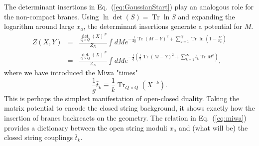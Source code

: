 \documentclass[english]{article}
\DeclareMathOperator{\Tr}{Tr}
\begin{document}
The determinant insertions in Eq.~(\ref{eq:GaussianStart}) play an analogous role for the non-compact branes. Using $ \ln \det \left( S \right) = \Tr \ln S $ and expanding the logarithm around large $x_{a}$, the determinant insertions generate a potential for $M$.
\begin{eqnarray} \label{eq:potentialgen}
   Z(X,Y) & = &  \frac{\det_{Q\times Q}(X)^N}{Z_{N}} \int dM e^{- \frac{1}{2g} \Tr \left( M-Y \right)^2 + \sum_{a=1}^{Q} \Tr \ln \left( 1- \frac{M}{x_{a}} \right)}  \\
   & = & \frac{\det_{Q\times Q} (X)^N}{Z_{N}} \int dM e^{- \frac{1}{g} \left( \frac{1}{2}\Tr \left( M-Y \right)^2 + \sum_{k=1}^{\infty} {\bar t}_{k} \Tr M^{k} \right)}, 
\end{eqnarray}
where we have introduced the Miwa "times"
\begin{equation} \label{eq:miwa}
    \frac{1}{g}{\bar t}_{k} \equiv \frac{1}{k} \Tr_{Q \times Q} \left( X^{-k} \right). 
\end{equation}
This is perhaps the simplest manifestation of open-closed duality. Taking the matrix potential to encode the closed string background, it shows exactly how the insertion of branes backreacts on the geometry. The relation in Eq.~(\ref{eq:miwa}) provides a dictionary between the open string moduli $x_{a}$ and (what will be) the closed string couplings ${\bar t}_{k}$. 
\end{document}
